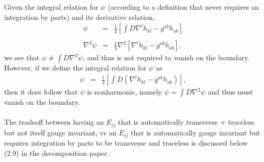 \documentclass[10pt,letterpaper]{article}
\numberwithin{equation}{section}
\begin{document}
\\ \\
Given the integral relation for $\psi$ (according to a definition that never requires an integration by parts) and its derivative relation,
\begin{eqnarray}
\psi &=& \frac{1}{4} \left[ \int D \nabla^l h_{kl} - g^{ab}h_{ab}\right]
\\ \nonumber\\
\nabla^2 \psi &=& \frac{1}{4} \nabla^2 \left[ \nabla^l h_{kl} - g^{ab}h_{ab}\right],
\end{eqnarray}
we see that $\psi \ne \int D \nabla^2 \psi$, and thus is not required to vanish on the boundary. However, if we define the integral relation for $\psi$ as 
\begin{eqnarray}
\psi &=& \frac{1}{4} \left[ \int D (\nabla^l h_{kl} - g^{ab}h_{ab}) \right],
\end{eqnarray}
then it does follow that $\psi$ is nonharmonic, namely $\psi = \int D \nabla^2 \psi$ and thus must vanish on the boundary. 
\\ \\
The tradeoff between having an $E_{ij}$ that is automatically transverse + traceless but not itself gauge invariant, vs an $E_{ij}$ that is automatically gauge invariant but requires integration by parts to be transverse and traceless is discussed below (2.9) in the decomposition paper.
\end{document}

